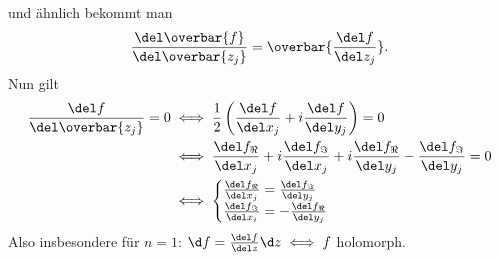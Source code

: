 		und ähnlich bekommt man 
		$$ \frac{\del \overbar{f}}{\del \overbar{z_j}} = \overbar{\frac{\del f}{\del z_j}}. $$
		Nun gilt
		\begin{align*}
			\frac{\del f}{\del \overbar{z_j}} = 0 &\iff \frac{1}{2} \left( \frac{\del f}{\del x_j} + i\frac{\del f}{\del y_j} \right) = 0\\
			&\iff \frac{\del f_\Re}{\del x_j} + i\frac{\del f_\Im}{\del x_j} + i\frac{\del f_\Re}{\del y_j} - \frac{\del f_\Im}{\del y_j} = 0\\
			&\iff \begin{cases}
			\frac{\del f_\Re}{\del x_j} = \frac{\del f_\Im}{\del y_j}\\
			\frac{\del f_\Im}{\del x_i} = -\frac{\del f_\Re}{\del y_j}
			\end{cases}
		\end{align*}
		Also insbesondere für $n=1$: $ \d f = \frac{\del f}{\del z}\d z \iff f $ holomorph. 